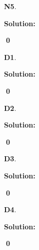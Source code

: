 \documentclass{article}
\newenvironment{problem}[1]
{
  \begin{flushleft}
  \textbf{#1}.
  \ignorespaces
}
{
  \end{flushleft}
}
\newenvironment{solution}
{
  \ignorespaces
  \textbf{Solution:}
}
{
  \ignorespacesafterend
  \begin{flushright}
  {\bfseries \qed}
  \end{flushright}
}
\begin{document}
\begin{problem}{N5}

\end{problem}
\begin{solution}

\end{solution}


\begin{problem}{D1}

\end{problem}
\begin{solution}

\end{solution}

\begin{problem}{D2}

\end{problem}
\begin{solution}

\end{solution}

\begin{problem}{D3}

\end{problem}
\begin{solution}

\end{solution}

\begin{problem}{D4}

\end{problem}
\begin{solution}

\end{solution}
\end{document}
